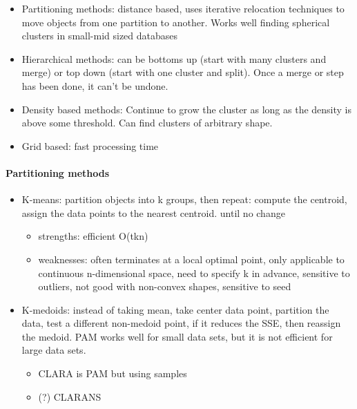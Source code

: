 \documentclass[11pt]{article}
\providecommand{\tightlist}{%
      \setlength{\itemsep}{0pt}\setlength{\parskip}{0pt}}
\begin{document}
    \begin{itemize}
\tightlist
\item
  Partitioning methods: distance based, uses iterative relocation
  techniques to move objects from one partition to another. Works well
  finding spherical clusters in small-mid sized databases
\item
  Hierarchical methods: can be bottoms up (start with many clusters and
  merge) or top down (start with one cluster and split). Once a merge or
  step has been done, it can't be undone.
\item
  Density based methods: Continue to grow the cluster as long as the
  density is above some threshold. Can find clusters of arbitrary shape.
\item
  Grid based: fast processing time
\end{itemize}

    \paragraph{Partitioning methods}\label{partitioning-methods}

    \begin{itemize}
\tightlist
\item
  K-means: partition objects into k groups, then repeat: compute the
  centroid, assign the data points to the nearest centroid. until no
  change

  \begin{itemize}
  \tightlist
  \item
    strengths: efficient O(tkn)
  \item
    weaknesses: often terminates at a local optimal point, only
    applicable to continuous n-dimensional space, need to specify k in
    advance, sensitive to outliers, not good with non-convex shapes,
    sensitive to seed
  \end{itemize}
\end{itemize}

    \begin{itemize}
\tightlist
\item
  K-medoids: instead of taking mean, take center data point, partition
  the data, test a different non-medoid point, if it reduces the SSE,
  then reassign the medoid. PAM works well for small data sets, but it
  is not efficient for large data sets.

  \begin{itemize}
  \tightlist
  \item
    CLARA is PAM but using samples
  \item
    (?) CLARANS
  \end{itemize}
\end{itemize}
\end{document}
